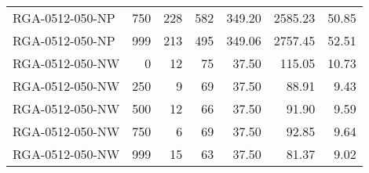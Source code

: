 \begin{table}[htbp]
{\begin{tabular}{lrrrrrr}
    RGA-0512-050-NP & 750    & 228    & 582    & 349.20 & 2585.23 & 50.85 \\
    RGA-0512-050-NP & 999    & 213    & 495    & 349.06 & 2757.45 & 52.51 \\ \hline
    RGA-0512-050-NW & 0      & 12     & 75     & 37.50  & 115.05 & 10.73 \\
    RGA-0512-050-NW & 250    & 9      & 69     & 37.50  & 88.91  & 9.43 \\
    RGA-0512-050-NW & 500    & 12     & 66     & 37.50  & 91.90  & 9.59 \\
    RGA-0512-050-NW & 750    & 6      & 69     & 37.50  & 92.85  & 9.64 \\
    RGA-0512-050-NW & 999    & 15     & 63     & 37.50  & 81.37  & 9.02 \\
    \bottomrule
    \end{tabular}}
  \label{tab:addlabel}%
\end{table}%
